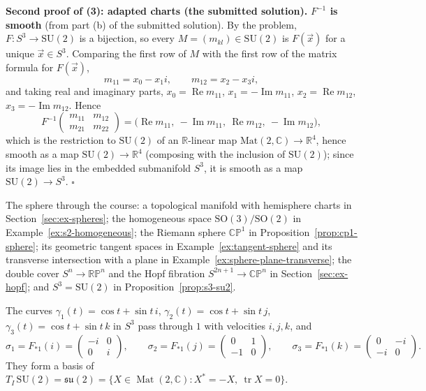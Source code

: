 \documentclass[11pt]{report}
\makeatletter
\newcounter{thmcounter}[section]
\renewenvironment{proof}[1][Proof]{\noindent\textbf{#1.} }{\hfill$\square$\par\vspace{5pt}}
\newcommand{\thmlabel}[1]{\edef\@currentlabel{\arabic{section}.\arabic{thmcounter}}\label{#1}}
\newcommand{\SO}{\mathrm{SO}}
\DeclareMathOperator{\Mat}{Mat}
\DeclareMathOperator{\tr}{tr}
\makeatother
\begin{document}
\begin{proof}[Second proof of (3): adapted charts (the submitted solution)]
\textbf{$F^{-1}$ is smooth} (from part (b) of the submitted solution). By the problem, $F : S^3 \to \mathrm{SU}(2)$ is a bijection, so every $M = (m_{kl}) \in \mathrm{SU}(2)$ is $F(\vec x)$ for a unique $\vec x \in S^3$. Comparing the first row of $M$ with the first row of the matrix formula for $F(\vec x)$,
\[
m_{11} = x_0 - x_1 i, \qquad m_{12} = x_2 - x_3 i,
\]
and taking real and imaginary parts, $x_0 = \operatorname{Re} m_{11}$, $x_1 = -\operatorname{Im} m_{11}$, $x_2 = \operatorname{Re} m_{12}$, $x_3 = -\operatorname{Im} m_{12}$. Hence
\[
F^{-1}\begin{pmatrix} m_{11} & m_{12} \\ m_{21} & m_{22} \end{pmatrix} = \bigl( \operatorname{Re} m_{11},\ -\operatorname{Im} m_{11},\ \operatorname{Re} m_{12},\ -\operatorname{Im} m_{12} \bigr),
\]
which is the restriction to $\mathrm{SU}(2)$ of an $\mathbb{R}$-linear map $\mathrm{Mat}(2, \mathbb{C}) \to \mathbb{R}^4$, hence smooth as a map $\mathrm{SU}(2) \to \mathbb{R}^4$ (composing with the inclusion of $\mathrm{SU}(2)$); since its image lies in the embedded submanifold $S^3$, it is smooth as a map $\mathrm{SU}(2) \to S^3$.
\end{proof}

The sphere through the course: a topological manifold with hemisphere charts in Section~\ref{sec:ex-spheres}; the homogeneous space $\SO(3)/\SO(2)$ in Example~\ref{ex:s2-homogeneous}; the Riemann sphere $\mathbb{CP}^1$ in Proposition~\ref{prop:cp1-sphere}; its geometric tangent spaces in Example~\ref{ex:tangent-sphere} and its transverse intersection with a plane in Example~\ref{ex:sphere-plane-transverse}; the double cover $S^n \to \mathbb{RP}^n$ and the Hopf fibration $S^{2n+1} \to \mathbb{CP}^n$ in Section~\ref{sec:ex-hopf}; and $S^3 = \mathrm{SU}(2)$ in Proposition~\ref{prop:s3-su2}.


\begin{propbox}\thmlabel{prop:su2-tangent}
The curves $\gamma_1(t) = \cos t + \sin t\, i$, $\gamma_2(t) = \cos t + \sin t\, j$, $\gamma_3(t) = \cos t + \sin t\, k$ in $S^3$ pass through $1$ with velocities $i, j, k$, and
\[
\sigma_1 = F_{*1}(i) = \begin{pmatrix} -i & 0 \\ 0 & i \end{pmatrix}, \qquad
\sigma_2 = F_{*1}(j) = \begin{pmatrix} 0 & 1 \\ -1 & 0 \end{pmatrix}, \qquad
\sigma_3 = F_{*1}(k) = \begin{pmatrix} 0 & -i \\ -i & 0 \end{pmatrix}.
\]
They form a basis of $T_I\,\mathrm{SU}(2) = \mathfrak{su}(2) = \{ X \in \Mat(2, \mathbb{C}) : X^* = -X,\ \tr X = 0 \}$.
\end{propbox}
\end{document}
